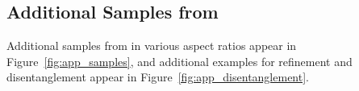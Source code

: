 \begin{appendices}
\section{Additional Samples from \modelname{}}

Additional samples from \modelname{} in various aspect ratios appear in Figure~\ref{fig:app_samples}, and additional examples for refinement and disentanglement appear in Figure~\ref{fig:app_disentanglement}.





% 

\end{appendices}

